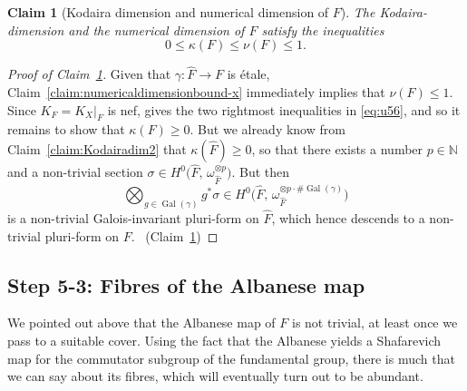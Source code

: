 \documentclass[JEP,XML,SOM,Unicode,published]{cedram}
\theoremstyle{plain}
\newtheorem{claim}[thm]{Claim}
\theoremstyle{definition}
\numberwithin{equation}{thm}
\numberwithin{enumi}{thm}
\DeclareMathOperator{\Gal}{Gal}
\newcommand{\bN}{\mathbb{N}}
\let\what\widehat
\begin{document}
\begin{claim}[Kodaira dimension and numerical dimension of $F$]\label{claim:kF}
The Kodaira-dimension and the numerical dimension of $F$ satisfy the
inequalities
\begin{equation}\label{eq:u56}
0 \leq \kappa(F) \leq \nu(F) \leq 1.
\end{equation}
\end{claim}
\begin{proof}[Proof of Claim~\ref{claim:kF}]
Given that $\gamma : \what{F} \to F$ is étale,
Claim~\ref{claim:numericaldimensionbound-x} immediately implies that
$\nu(F) \leq 1$. Since $K_F = K_X|_F$ is nef, \cite[Prop.\,2.2]{MR782236} gives the
two rightmost inequalities in \eqref{eq:u56}, and so it remains to show that
$\kappa(F) \geq 0$. But we already know from Claim~\ref{claim:Kodairadim2} that
$\kappa(\what{F}) \geq 0$, so that there exists a number $p \in \bN$ and a non-trivial
section $\sigma \in H^0\bigl(\what{F},\, \omega^{\otimes p}_{\what{F}}\bigr)$. But then
\[
\bigotimes_{g \in \Gal(\gamma)} g^*\sigma \in H^0\bigl(\what{F},\, \omega^{\otimes p\cdot \#\Gal(\gamma)}_{\what{F}}\bigr)
\]
is a non-trivial Galois-invariant pluri-form on $\what{F}$, which hence
descends to a non-trivial pluri-form on $F$.
\qedhere~\mbox{(Claim~\ref{claim:kF})}
\end{proof}

\subsection*{Step 5-3: Fibres of the Albanese map}

We pointed out above that the Albanese map of $F$ is not trivial, at least once
we pass to a suitable cover. Using the fact that the Albanese yields a
Shafarevich map for the commutator subgroup of the fundamental group, there is
much that we can say about its fibres, which will eventually turn out to be
abundant.
\end{document}
